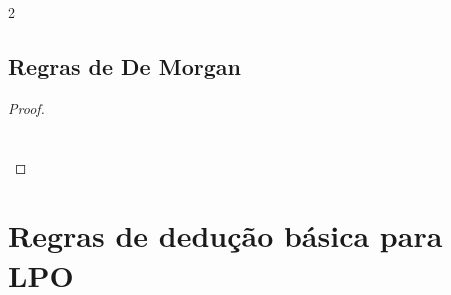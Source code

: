 \begin{multicols}{2}
\subsection*{Regras de De Morgan}
\begin{proof}
\\	
\\	
\\	
\end{proof}
\end{multicols}

\newpage

\section{Regras de dedução básica para LPO}


